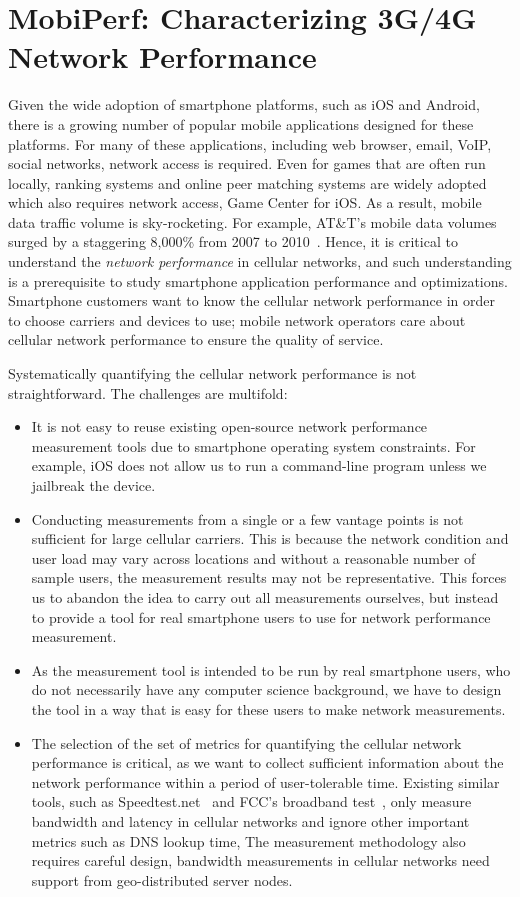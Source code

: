 \chapter{MobiPerf: Characterizing 3G/4G Network Performance}
\label{chap:net}

Given the wide adoption of smartphone platforms, such as iOS and Android, there is a growing number of popular mobile applications designed for these platforms. For many of these applications, including web browser, email, VoIP, social networks, network access is required. Even for games that are often run locally, ranking systems and online peer matching systems are widely adopted which also requires network access, \eg Game Center for iOS. As a result, mobile data traffic volume is sky-rocketing. For example, AT\&T's mobile data volumes surged by a staggering 8,000\% from 2007 to 2010~\cite{att.overload}. Hence, it is critical to understand the {\em network performance} in cellular networks, and such understanding is a prerequisite to study smartphone application performance and optimizations. Smartphone customers want to know the cellular network performance in order to choose carriers and devices to use; mobile network operators care about cellular network performance to ensure the quality of service.

Systematically quantifying the cellular network performance is not straightforward. The challenges are multifold:
\begin{itemize}
\item It is not easy to reuse existing open-source network performance measurement tools due to smartphone operating system constraints. For example, iOS does not allow us to run a command-line program unless we jailbreak the device.
\item Conducting measurements from a single or a few vantage points is not sufficient for large cellular carriers. This is because the network condition and user load may vary across locations and without a reasonable number of sample users, the measurement results may not be representative. This forces us to abandon the idea to carry out all measurements ourselves, but instead to provide a tool for real smartphone users to use for network performance measurement.
\item As the measurement tool is intended to be run by real smartphone users, who do not necessarily have any computer science background, we have to design the tool in a way that is easy for these users to make network measurements.
\item The selection of the set of metrics for quantifying the cellular network performance is critical, as we want to collect sufficient information about the network performance within a period of user-tolerable time. Existing similar tools, such as Speedtest.net~\cite{speedtestnet} 
and FCC's broadband test~\cite{fccspeedtest}, only measure bandwidth and latency in cellular networks and ignore other important metrics such as DNS lookup time, \etc The measurement methodology also requires careful design, \eg bandwidth measurements in cellular networks need support from geo-distributed server nodes.
\end{itemize}


